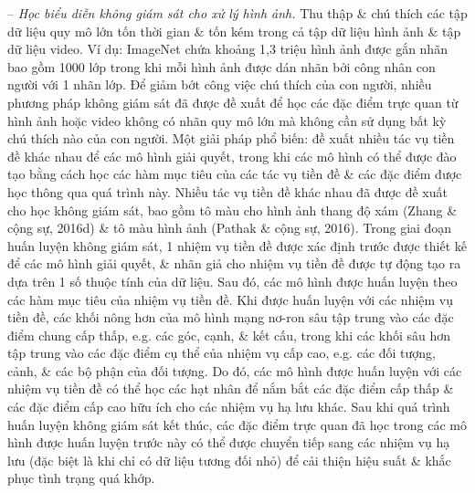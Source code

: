 \documentclass{article}
\begin{document}
\begin{itemize}
\begin{itemize}
\begin{itemize}
            -- {\it Học biểu diễn không giám sát cho xử lý hình ảnh.} Thu thập \& chú thích các tập dữ liệu quy mô lớn tốn thời gian \& tốn kém trong cả tập dữ liệu hình ảnh \& tập dữ liệu video. Ví dụ: ImageNet chứa khoảng 1,3 triệu hình ảnh được gắn nhãn bao gồm 1000 lớp trong khi mỗi hình ảnh được dán nhãn bởi công nhân con người với 1 nhãn lớp. Để giảm bớt công việc chú thích của con người, nhiều phương pháp không giám sát đã được đề xuất để học các đặc điểm trực quan từ hình ảnh hoặc video không có nhãn quy mô lớn mà không cần sử dụng bất kỳ chú thích nào của con người. Một giải pháp phổ biến: đề xuất nhiều tác vụ tiền đề khác nhau để các mô hình giải quyết, trong khi các mô hình có thể được đào tạo bằng cách học các hàm mục tiêu của các tác vụ tiền đề \& các đặc điểm được học thông qua quá trình này. Nhiều tác vụ tiền đề khác nhau đã được đề xuất cho học không giám sát, bao gồm tô màu cho hình ảnh thang độ xám (Zhang \& cộng sự, 2016d) \& tô màu hình ảnh (Pathak \& cộng sự, 2016). Trong giai đoạn huấn luyện không giám sát, 1 nhiệm vụ tiền đề được xác định trước được thiết kế để các mô hình giải quyết, \& nhãn giả cho nhiệm vụ tiền đề được tự động tạo ra dựa trên 1 số thuộc tính của dữ liệu. Sau đó, các mô hình được huấn luyện theo các hàm mục tiêu của nhiệm vụ tiền đề. Khi được huấn luyện với các nhiệm vụ tiền đề, các khối nông hơn của mô hình mạng nơ-ron sâu tập trung vào các đặc điểm chung cấp thấp, e.g. các góc, cạnh, \& kết cấu, trong khi các khối sâu hơn tập trung vào các đặc điểm cụ thể của nhiệm vụ cấp cao, e.g. các đối tượng, cảnh, \& các bộ phận của đối tượng. Do đó, các mô hình được huấn luyện với các nhiệm vụ tiền đề có thể học các hạt nhân để nắm bắt các đặc điểm cấp thấp \& các đặc điểm cấp cao hữu ích cho các nhiệm vụ hạ lưu khác. Sau khi quá trình huấn luyện không giám sát kết thúc, các đặc điểm trực quan đã học trong các mô hình được huấn luyện trước này có thể được chuyển tiếp sang các nhiệm vụ hạ lưu (đặc biệt là khi chỉ có dữ liệu tương đối nhỏ) để cải thiện hiệu suất \& khắc phục tình trạng quá khớp.


\end{itemize}
\end{itemize}
\end{itemize}
\end{document}
